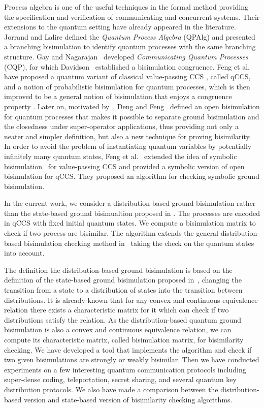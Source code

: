 \documentclass[runningheads]{llncs}
\begin{document}
Process algebra is one of the useful techniques in the formal method providing the specification and verification of communicating and concurrent systems. 
Their extensions to the quantum setting have already appeared in the literature. Jorrand and Lalire \cite{JL04,La06} defined the \emph{Quantum Process Algebra} (QPAlg) and presented a branching bisimulation to identify quantum processes with the same branching structure. Gay and Nagarajan~\cite{GN05}  developed \emph{Communicating Quantum Processes} (CQP), for which Davidson~\cite{Da11} established a bisimulation congruence.
Feng et al. \cite{FDJY07} have proposed a quantum variant of classical value-passing CCS \cite{ccs}, called qCCS, and a notion of probabilistic bisimulation for quantum processes, which is then improved to be a general notion of bisimulation that enjoys a congruence property \cite{FDY11}. Later on, motivated by~\cite{San96}, Deng and Feng~\cite{DF12} defined an open bisimulation for quantum processes that makes it possible to separate ground bisimulation and the closedness under super-operator applications, thus providing not only a neater and simpler definition, but also a new technique for proving bisimilarity.
In order to avoid the problem of instantiating quantum variables by potentially infinitely many quantum states, Feng et al.~\cite{FDY14} extended the idea of symbolic bisimulation~\cite{HL95} for value-passing CCS and provided a symbolic version of open bisimulation for qCCS. They  proposed an algorithm for checking symbolic ground bisimulation.

In the current work, we consider a distribution-based ground bisimulation rather than the state-based ground bisimualtion proposed in \cite{DF12}. The processes are encoded in qCCS with fixed initial quantum states. We compute a bisimulation matrix to check if two process are bisimilar. The algorithm extends the general distribution-based bisimulation checking method in~\cite{HKK14} taking the check on the quantum states into account. 

The definition the distribution-based ground bisimulation is based on the definition of the state-based ground bisimulation proposed in~\cite{DF12}, changing the transition from a state to a distribution of states into the transition between distributions. It is already known that for any convex and continuous equivalence relation there exists a characteristic matrix for it which can check if two distributions satisfy the relation. As the  distribution-based quantum ground bisimulation is also a convex and continuous equivalence relation, we can compute its characteristic matrix, called bisimulation matrix, for bisimilarity checking. 
We have developed a tool that implements the algorithm and check if two given bisimulations are strongly or weakly bisimilar. Then we have conducted experiments on a few interesting quantum communication protocols including super-dense coding, teleportation, secret sharing, and several quantum key distribution protocols. We also have made a comparison between the distribution-based version and state-based version of bisimilarity checking algorithms.
\end{document}

